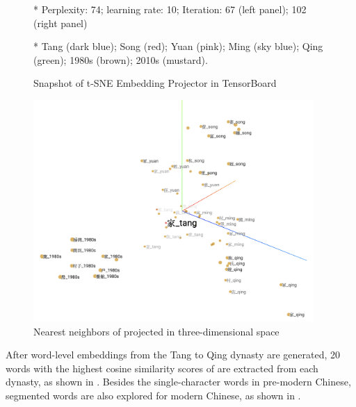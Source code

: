 \begin{figure}[H]
\begin{threeparttable}
\begin{minipage}[b]{0.45\linewidth}
  \end{minipage}
    \begin{tablenotes}
      \linespread{1}\footnotesize
      \item[*]\hspace*{-\fontdimen2\font}Perplexity: 74; learning rate: 10; Iteration: 67 (left panel); 102 (right panel)
      \item[*]\hspace*{-\fontdimen2\font}Tang (dark blue); Song (red); Yuan (pink); Ming (sky blue); Qing (green); 1980s (brown); 2010s (mustard).
    \end{tablenotes}
  \end{threeparttable}
  \caption{Snapshot of t-SNE Embedding Projector in TensorBoard} \label{fig:tensorboard_tSNE}
\end{figure}

\begin{figure}[H]
  \centering
  \includegraphics[height=0.475\textheight,width=0.95\textwidth,keepaspectratio]{figures_new/from_old/jia_neighboring_words}
  \caption{Nearest neighbors of \jia projected in three-dimensional space} \label{fig:tensorboard_jia}
\end{figure}

After word-level embeddings from the Tang to Qing dynasty are generated, 20 words with the highest cosine similarity scores of \jia are extracted from each dynasty, as shown in . Besides the single-character words in pre-modern Chinese, segmented words are also explored for modern Chinese, as shown in .

